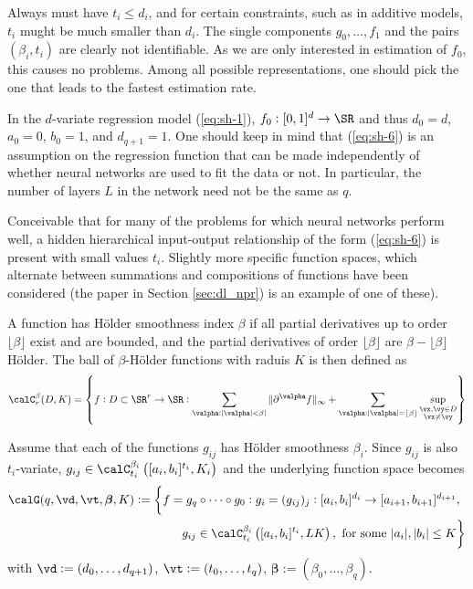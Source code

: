 Always must have $t_i \leq d_i$, and for certain constraints, such as in additive models, $t_i$ mught be much smaller than $d_i$.  The single components $g_0, \dots, f_1$ and the pairs $(\beta_i, t_i)$ are clearly not identifiable. As we are only interested in estimation of $f_0$, this causes no problems. Among all possible representations, one should pick the one that leads to the fastest estimation rate. 

In the $d$-variate regression model (\ref{eq:sh-1}), $f_0: [0,1]^d\to\SR$ and thus $d_0 = d$, $a_0 = 0$, $b_0 = 1$, and $d_{q+1} = 1$. One should keep in mind that (\ref{eq:sh-6}) is an assumption on the regression function that can be made independently of whether neural networks are used to fit the data or not. In particular, the number of layers $L$ in the network need not be the same as $q$. 

Conceivable that for many of the problems for which neural networks perform well, a hidden hierarchical input-output relationship of the form (\ref{eq:sh-6}) is present with small values $t_i$. Slightly more specific function spaces, which alternate between summations and compositions of functions have been considered (the paper in Section \ref{sec:dl_npr}) is an example of one of these). 

A function has Hölder smoothness index $\beta$ if all partial derivatives up to order $\lfloor \beta \rfloor$ exist and are bounded, and the partial derivatives of order $\lfloor \beta \rfloor$ are $\beta - \lfloor \beta \rfloor$ Hölder. The ball of $\beta$-Hölder functions with raduis $K$ is then defined as 
\[\calC_r^\beta(D,K) = \left\{f:D\subset\SR^r\to\SR: \sum_{\valpha : |\valpha| < \beta|} \|\partial^\valpha f\|_\infty + \sum_{{\valpha}: |\valpha|= \lfloor\beta\rfloor} \sup_{\substack{\vx,\vy \in D \\ \vx \neq \vy}}\right\}\]

Assume that each of the functions $g_{ij}$ has Hölder smoothness $\beta_i$. Since $g_{ij}$ is also $t_i$-variate, $g_{ij}\in \calC_{t_i}^{\beta_i}\left([a_i,b_i]^{t_i}, K_i\right)$ and the underlying function space becomes
\begin{align*}
	\calG(q,\vd,\vt,\bm{\beta}, K) := \bigg\{f = g_q \circ \dots \circ g_0: g_i = (g_{ij})_j: [a_i,b_i]^{d_i}\to [a_{i+1}, b_{i+1}]^{d_{i+1}}&, \\g_{ij}\in \calC_{t_i}^{\beta_i}\left([a_i,b_i]^{t_i}, LK\right), \text{ for some }|a_i|, |b_i| \leq K&\bigg\}
\end{align*}
with $\vd := (d_0, \dots, d_{q+1})$, $\vt:=(t_0, \dots, t_q)$, $\bm{\beta}:= (\beta_0, \dots, \beta_q)$. 

